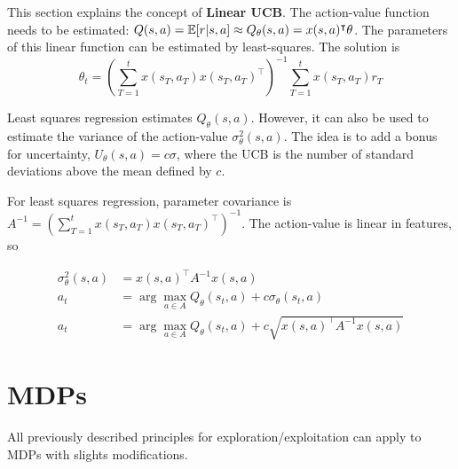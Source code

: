 This section explains the concept of \textbf{Linear UCB}. The action-value function needs to be estimated: $Q(s, a) = \operatorname{\mathbb{E}}[r|s,a] \approx Q_\theta(s, a) = x(s, a)^\intercal \theta$. The parameters of this linear function can be estimated by least-squares. The solution is
\begin{equation*}
	\theta_t = \left(\sum_{T=1}^t x(s_T, a_T)x(s_T, a_T)^\intercal\right)^{-1} \sum_{T=1}^t x(s_T, a_T)r_T
\end{equation*}

Least squares regression estimates $Q_\theta(s, a)$. However, it can also be used to estimate the variance of the action-value $\sigma^2_\theta(s, a)$. The idea is to add a bonus for uncertainty, $U_\theta(s, a) = c\sigma$, where the UCB is the number of standard deviations above the mean defined by $c$.

For least squares regression, parameter covariance is $A^{-1} = \left(\sum_{T=1}^t x(s_T, a_T)x(s_T, a_T)^\intercal\right)^{-1}$. The action-value is linear in features, so

\begin{equation*}
	\begin{aligned}
		\sigma^2_\theta(s, a) & = x(s, a)^\intercal A^{-1} x(s, a)\\
		a_t & = \arg\max_{a \in A} Q_\theta(s_t, a) + c\sigma_\theta(s_t, a)\\
		a_t & = \arg\max_{a \in A} Q_\theta(s_t, a) + c \sqrt{x(s, a)^\intercal A^{-1} x(s, a)}
	\end{aligned}
\end{equation*}

\section{MDPs}

All previously described principles for exploration/exploitation can apply to MDPs with slights modifications.

